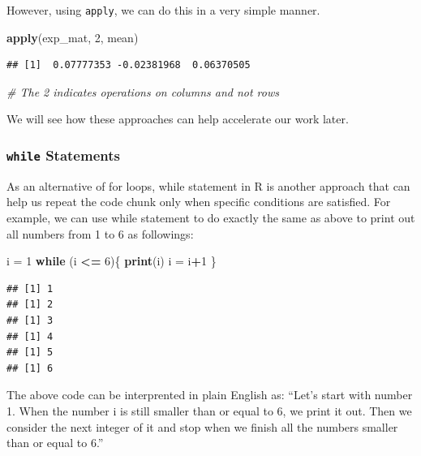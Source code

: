 \documentclass[12pt,]{krantz}
\newenvironment{Shaded}{\begin{snugshade}}{\end{snugshade}}
\newcommand{\KeywordTok}[1]{\textcolor[rgb]{0.27,0.27,0.27}{\textbf{#1}}}
\newcommand{\DecValTok}[1]{\textcolor[rgb]{0.06,0.06,0.06}{#1}}
\newcommand{\StringTok}[1]{\textcolor[rgb]{0.5,0.5,0.5}{#1}}
\newcommand{\CommentTok}[1]{\textcolor[rgb]{0.37,0.37,0.37}{\textit{#1}}}
\newcommand{\ControlFlowTok}[1]{\textcolor[rgb]{0.27,0.27,0.27}{\textbf{#1}}}
\newcommand{\OperatorTok}[1]{\textcolor[rgb]{0.43,0.43,0.43}{\textbf{#1}}}
\newcommand{\NormalTok}[1]{#1}
\begin{document}
However, using \texttt{apply}, we can do this in a very simple manner.

\begin{Shaded}
\begin{Highlighting}[]
\KeywordTok{apply}\NormalTok{(exp_mat, }\DecValTok{2}\NormalTok{, mean) }
\end{Highlighting}
\end{Shaded}

\begin{verbatim}
## [1]  0.07777353 -0.02381968  0.06370505
\end{verbatim}

\begin{Shaded}
\begin{Highlighting}[]
\CommentTok{# The 2 indicates operations on columns and not rows }
\end{Highlighting}
\end{Shaded}

We will see how these approaches can help accelerate our work later.

\subsubsection{\texorpdfstring{\texttt{while}
Statements}{while Statements}}\label{while-statements}

As an alternative of for loops, while statement in R is another approach
that can help us repeat the code chunk only when specific conditions are
satisfied. For example, we can use while statement to do exactly the
same as above to print out all numbers from 1 to 6 as followings:

\begin{Shaded}
\begin{Highlighting}[]
\NormalTok{i =}\StringTok{ }\DecValTok{1}
\ControlFlowTok{while}\NormalTok{ (i }\OperatorTok{<=}\StringTok{ }\DecValTok{6}\NormalTok{)\{}
  \KeywordTok{print}\NormalTok{(i)}
\NormalTok{  i =}\StringTok{ }\NormalTok{i}\OperatorTok{+}\DecValTok{1}
\NormalTok{\}}
\end{Highlighting}
\end{Shaded}

\begin{verbatim}
## [1] 1
## [1] 2
## [1] 3
## [1] 4
## [1] 5
## [1] 6
\end{verbatim}

The above code can be interprented in plain English as: ``Let's start
with number 1. When the number i is still smaller than or equal to 6, we
print it out. Then we consider the next integer of it and stop when we
finish all the numbers smaller than or equal to 6.''
\end{document}
